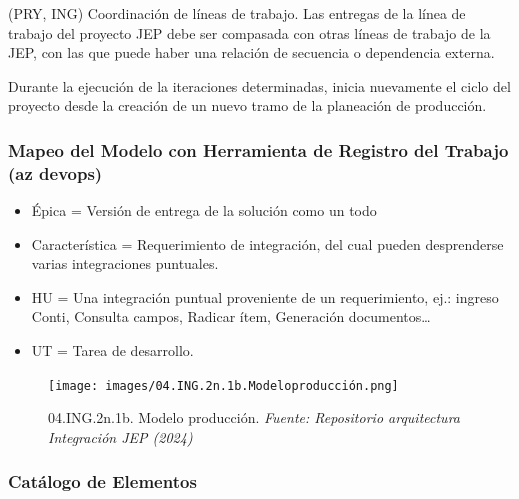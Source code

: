 \documentclass[
  paper=a4,
  ,captions=tableheading
]{scrartcl}
\providecommand{\tightlist}{%
  \setlength{\itemsep}{0pt}\setlength{\parskip}{0pt}}
\begin{document}
(PRY, ING) Coordinación de líneas de trabajo. Las entregas de la línea
de trabajo del proyecto JEP debe ser compasada con otras líneas de
trabajo de la JEP, con las que puede haber una relación de secuencia o
dependencia externa.

Durante la ejecución de la iteraciones determinadas, inicia nuevamente
el ciclo del proyecto desde la creación de un nuevo tramo de la
planeación de producción.

\subsubsection{Mapeo del Modelo con Herramienta de Registro del Trabajo
(az
devops)}\label{sec:mapeo-del-modelo-con-herramienta-de-registro-del-trabajo-az-devops}

\begin{itemize}
\tightlist
\item
  Épica = Versión de entrega de la solución como un todo
\item
  Característica = Requerimiento de integración, del cual pueden
  desprenderse varias integraciones puntuales.
\item
  HU = Una integración puntual proveniente de un requerimiento, ej.:
  ingreso Conti, Consulta campos, Radicar ítem, Generación
  documentos\ldots{}
\item
  UT = Tarea de desarrollo.
\end{itemize}

\begin{figure}
\centering
\texttt{[image: images/04.ING.2n.1b.Modeloproducción.png]}
\caption{04.ING.2n.1b. Modelo producción. \emph{Fuente: Repositorio
arquitectura Integración JEP
(2024)}}\label{fig:id-9938d5859d53450fa5c5c953d9ce33cb}
\end{figure}

\subsubsection{Catálogo de
Elementos}\label{sec:catuxe1logo-de-elementos-1}
\end{document}
